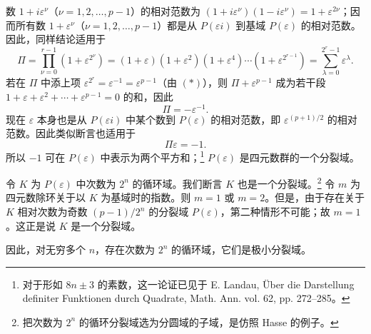 数 $1+i\varepsilon^\nu$（$\nu=1,2,\ldots,p-1$）的相对范数为 $(1+i\varepsilon^\nu)(1-i\varepsilon^\nu)=1+\varepsilon^{2\nu}$；因而所有数 $1+\varepsilon^\nu$（$\nu=1,2,\ldots,p-1$）都是从 $P(\varepsilon i)$ 到基域 $P(\varepsilon)$ 的相对范数。因此，同样结论适用于
\[
\Pi=\prod_{\nu=0}^{r-1}(1+\varepsilon^{2^\nu})
=(1+\varepsilon)(1+\varepsilon^2)(1+\varepsilon^4)\cdots(1+\varepsilon^{2^{r-1}})
=\sum_{\lambda=0}^{2^r-1}\varepsilon^\lambda.
\]
若在 $\Pi$ 中添上项 $\varepsilon^{2^r}=\varepsilon^{-1}=\varepsilon^{p-1}$（由 $(*)$），则 $\Pi+\varepsilon^{p-1}$ 成为若干段 $1+\varepsilon+\varepsilon^2+\cdots+\varepsilon^{p-1}=0$ 的和，因此
\[
        \Pi=-\varepsilon^{-1}.
\]
现在 $\varepsilon$ 本身也是从 $P(\varepsilon i)$ 中某个数到 $P(\varepsilon)$ 的相对范数，即 $\varepsilon^{(p+1)/2}$ 的相对范数。因此类似断言也适用于
\[
        \Pi\varepsilon=-1.
\]
所以 $-1$ 可在 $P(\varepsilon)$ 中表示为两个平方和；\footnote{对于形如 $8n\pm3$ 的素数，这一论证已见于 E. Landau, Über die Darstellung definiter Funktionen durch Quadrate, Math. Ann. vol. 62, pp. 272--285。} $P(\varepsilon)$ 是四元数群的一个分裂域。

令 $K$ 为 $P(\varepsilon)$ 中次数为 $2^n$ 的循环域。我们断言 $K$ 也是一个分裂域。\footnote{把次数为 $2^n$ 的循环分裂域选为分圆域的子域，是仿照 Hasse 的例子。} 令 $m$ 为四元数除环关于以 $K$ 为基域时的指数。则 $m=1$ 或 $m=2$。但是，由于存在关于 $K$ 相对次数为奇数 $(p-1)/2^n$ 的分裂域 $P(\varepsilon)$，第二种情形不可能；故 $m=1$。这正是说 $K$ 是一个分裂域。

因此，对无穷多个 $n$，存在次数为 $2^n$ 的循环域，它们是极小分裂域。

\clearpage
\setcounter{footnote}{0}

